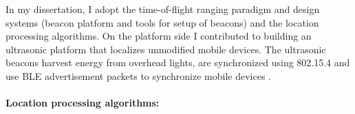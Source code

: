 \documentclass[10pt]{article}
\begin{document}
In my dissertation, I adopt the time-of-flight ranging paradigm and design systems (beacon platform and tools for setup of beacons) and the location processing algorithms. %
On the platform side I contributed to building an ultrasonic platform that localizes unmodified mobile devices. The ultrasonic beacons harvest energy from overhead lights, are synchronized using 802.15.4 and use BLE advertisement packets to synchronize mobile devices
\cite{rtas-alps-platform, lazik2015alps,lazik2015alpsdemo}.

\paragraph{Location processing algorithms: }
\end{document}
